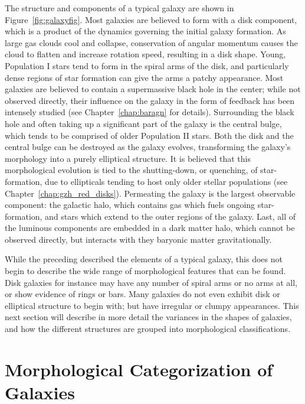 The structure and components of a typical galaxy are shown in Figure~\ref{fig:galaxyfig}. Most galaxies are believed to form with a disk component, which is a product of the dynamics governing the initial galaxy formation. As large gas clouds cool and collapse, conservation of angular momentum causes the cloud to flatten and increase rotation speed, resulting in a disk shape. Young, Population I stars tend to form in the spiral arms of the disk, and particularly dense regions of star formation can give the arms a patchy appearance. Most galaxies are believed to contain a supermassive black hole in the center; while not observed directly, their influence on the galaxy in the form of feedback has been intensely studied (see Chapter~\ref{chap:baragn} for details). Surrounding the black hole and often taking up a significant part of the galaxy is the central bulge, which tends to be comprised of older Population II stars. Both the disk and the central bulge can be destroyed as the galaxy evolves, transforming the galaxy's morphology into a purely elliptical structure. It is believed that this morphological evolution is tied to the shutting-down, or quenching, of star-formation, due to ellipticals tending to host only older stellar populations (see Chapter~\ref{chap:gzh_red_disks}). Permeating the galaxy is the largest observable component: the galactic halo, which contains gas which fuels ongoing star-formation, and stars which extend to the outer regions of the galaxy. Last, all of the luminous components are embedded in a dark matter halo, which cannot be observed directly, but interacts with they baryonic matter gravitationally. 

While the preceding described the elements of a typical galaxy, this does not begin to describe the wide range of morphological features that can be found. Disk galaxies for instance may have any number of spiral arms or no arms at all, or show evidence of rings or bars. Many galaxies do not even exhibit disk or elliptical structure to begin with; but have irregular or clumpy appearances. This next section will describe in more detail the variances in the shapes of galaxies, and how the different structures are grouped into morphological classifications. 

\section{Morphological Categorization of Galaxies}

